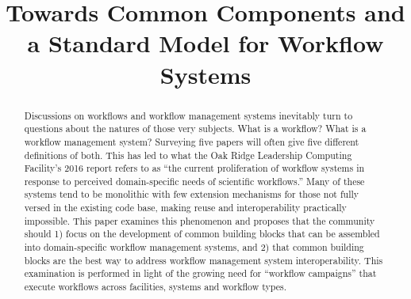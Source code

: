 \documentclass[10pt,conference,final]{IEEEtran}
\begin{document}

\title{Towards Common Components and a Standard Model for Workflow Systems}


\author{  \and {}  }

\maketitle

\begin{abstract} 

Discussions on workflows and workflow management systems inevitably turn to
questions about the natures of those very subjects. What is a workflow? What is
a workflow management system? Surveying five papers will often give five
different definitions of both. This has led to what the Oak Ridge Leadership
Computing Facility's 2016 report refers to as ``the current proliferation of
workflow systems in response to perceived domain-specific needs of scientific
workflows.'' Many of these systems tend to be monolithic with few extension
mechanisms for those not fully versed in the existing code base, making reuse
and interoperability practically impossible. This paper examines this phenomenon
and proposes that the community should 1) focus on the development of common
building blocks that can be assembled into domain-specific workflow management
systems, and 2) that common building blocks are the best way to address workflow
management system interoperability. This examination is performed in light of
the growing need for ``workflow campaigns'' that execute workflows across
facilities, systems and workflow types.

\end{abstract}
\end{document}
